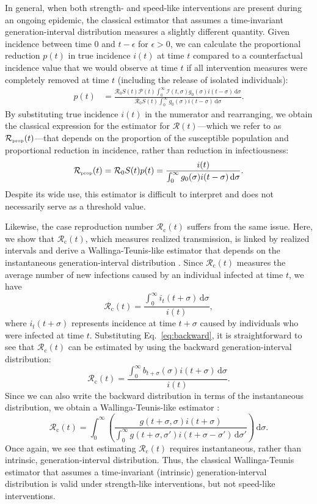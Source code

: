 \documentclass[12pt]{article}
\newcommand{\eref}[1]{Eq.~\ref{eq:#1}}
\newcommand{\Rx}[1]{\ensuremath{{\mathcal R}_{#1}}\xspace}
\newcommand{\Ro}{\Rx{0}}
\newcommand{\Rc}{\Rx{\mathrm{c}}}
\newcommand{\RR}{\ensuremath{{\mathcal R}}\xspace}
\newcommand{\tsub}[2]{#1_{{\textrm{\tiny #2}}}}
\newcommand{\dd}[1]{\ensuremath{\, \mathrm{d}#1}}
\newcommand{\dsigma}{\dd{\sigma}}
\newcommand{\PP}{{\mathcal P}}
\newcommand{\II}{{\mathcal I}}
\begin{document}
In general, when both strength- and speed-like interventions are present during an ongoing epidemic, the classical estimator that assumes a time-invariant generation-interval distribution measures a slightly different quantity.
Given incidence between time $0$ and $t-\epsilon$ for $\epsilon > 0$, we can calculate the proportional reduction $p(t)$ in true incidence $i(t)$ at time $t$ compared to a counterfactual incidence value that we would observe at time $t$ if all intervention measures were completely removed at time $t$ (including the release of isolated individuals):
\begin{align}
p(t) &= \frac{\Ro S(t) \PP(t) \int_0^\infty \II(t, \sigma) g_0(\sigma) i(t-\sigma)\dsigma}{\Ro S(t) \int_0^\infty g_0(\sigma) i(t-\sigma) \dsigma}.
\end{align}
By substituting true incidence $i(t)$ in the numerator and rearranging, we obtain the classical expression for the estimator for $\RR(t)$---which we refer to as $\tsub{\RR}{prop}(t)$---that depends on the proportion of the susceptible population and proportional reduction in incidence, rather than reduction in infectiousness:
\begin{equation}
\tsub{\RR}{prop}(t) = \Ro S(t) p(t) = \frac{i(t)}{\int_0^\infty g_0(\sigma) i(t-\sigma) \dsigma}.
\end{equation}
Despite its wide use, this estimator is difficult to interpret and does not necessarily serve as a threshold value.

Likewise, the case reproduction number $\Rc(t)$ suffers from the same issue. 
Here, we show that $\Rc(t)$, which measures realized transmission, is linked by realized intervals and derive a Wallinga-Teunis-like estimator that depends on the instantaneous generation-interval distribution \citep{wallinga2004different}.
Since $\Rc(t)$ measures the average number of new infections caused by an individual infected at time $t$, we have
\begin{equation}
\Rc(t) = \frac{\int_0^\infty i_t(t+\sigma) \dsigma}{i(t)},
\end{equation}
where $i_t(t+\sigma)$ represents incidence at time $t+\sigma$ caused by individuals who were infected at time $t$.
Substituting \eref{backward}, it is straightforward to see that $\Rc(t)$ can be estimated by using the backward generation-interval distribution:
\begin{equation}
\Rc(t) = \frac{\int_0^\infty b_{t+\sigma}(\sigma) i(t+\sigma) \dsigma}{i(t)}.
\end{equation}
Since we can also write the backward distribution in terms of the instantaneous distribution, we obtain a Wallinga-Teunis-like estimator \citep{wallinga2004different}:
\begin{equation}
\Rc(t) = \int_0^\infty \left(\frac{g(t+\sigma,\sigma) i(t+\sigma)}{\int_0^\infty g(t+\sigma,\sigma') i(t+\sigma-\sigma') \dsigma'} \right) \dsigma.
\end{equation}
Once again, we see that estimating $\Rc(t)$ requires instantaneous, rather than intrinsic, generation-interval distribution.
Thus, the classical Wallinga-Teunis estimator that assumes a time-invariant (intrinsic) generation-interval distribution is valid under strength-like interventions, but not speed-like interventions.
\end{document}
